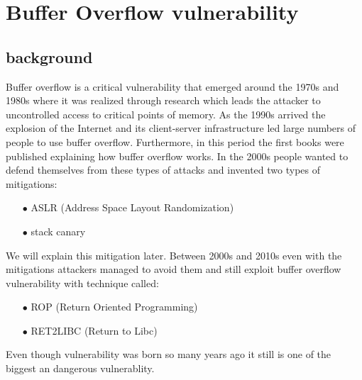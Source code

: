 \documentclass{report}
\begin{document}
    \chapter{Buffer Overflow vulnerability}
    \section{background} %
    Buffer overflow is a critical vulnerability that emerged around the 1970s and 1980s where it was 
    realized through research which leads the attacker to uncontrolled access to critical points of memory.\newline
    As the 1990s arrived the explosion of the Internet and its client-server infrastructure led large numbers of people to use buffer overflow.\newline
    Furthermore, in this period the first books were published explaining how buffer overflow works.\newline
    In the 2000s people wanted to defend themselves from these types of attacks and invented two types of mitigations:\newline
    \begin{itemize}
        \item[$\bullet$] ASLR (Address Space Layout Randomization)
        \item[$\bullet$] stack canary 
    \end{itemize}
    We will explain this mitigation later.\newline
    Between 2000s and 2010s even with the mitigations attackers managed to avoid them and still exploit buffer overflow vulnerability with technique called:\newline
        \begin{itemize}
        \item[$\bullet$] ROP (Return Oriented Programming)
        \item[$\bullet$] RET2LIBC (Return to Libc)
    \end{itemize}
    Even though vulnerability was born so many years ago it still is one of the biggest an dangerous vulnerablity.
    \clearpage
\end{document}
